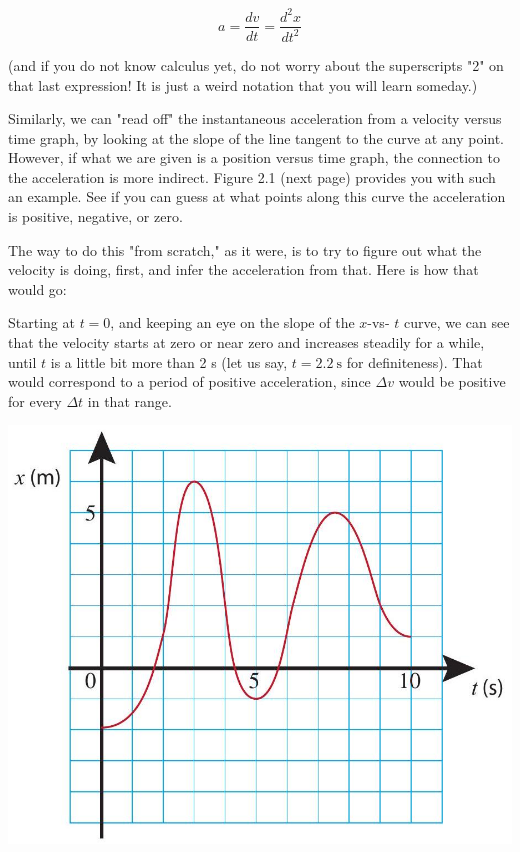 \documentclass[10pt]{article}
\begin{document}
\begin{equation*}
a=\frac{d v}{d t}=\frac{d^{2} x}{d t^{2}} \tag{2.3}
\end{equation*}


(and if you do not know calculus yet, do not worry about the superscripts "2" on that last expression! It is just a weird notation that you will learn someday.)

Similarly, we can "read off" the instantaneous acceleration from a velocity versus time graph, by looking at the slope of the line tangent to the curve at any point. However, if what we are given is a position versus time graph, the connection to the acceleration is more indirect. Figure 2.1 (next page) provides you with such an example. See if you can guess at what points along this curve the acceleration is positive, negative, or zero.

The way to do this "from scratch," as it were, is to try to figure out what the velocity is doing, first, and infer the acceleration from that. Here is how that would go:

Starting at $t=0$, and keeping an eye on the slope of the $x$-vs- $t$ curve, we can see that the velocity starts at zero or near zero and increases steadily for a while, until $t$ is a little bit more than 2 s (let us say, $t=2.2 \mathrm{~s}$ for definiteness). That would correspond to a period of positive acceleration, since $\Delta v$ would be positive for every $\Delta t$ in that range.

\begin{center}
\includegraphics[max width=\textwidth]{2024_09_14_9969b06773f10b6936e8g-054}
\end{center}
\end{document}
